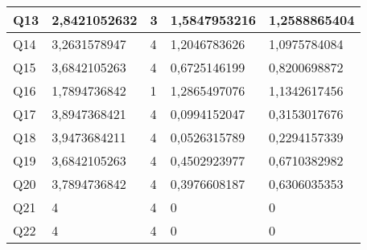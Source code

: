 \begin{appendices}
\begin{table}[!ht]
\begin{tabular}{|l|l|l|l|l|}
			Q13               & 2,8421052632  & 3               & 1,5847953216      & 1,2588865404    \\ \hline
			Q14               & 3,2631578947  & 4               & 1,2046783626      & 1,0975784084    \\ \hline
			Q15               & 3,6842105263  & 4               & 0,6725146199      & 0,8200698872    \\ \hline
			Q16               & 1,7894736842  & 1               & 1,2865497076      & 1,1342617456    \\ \hline
			Q17               & 3,8947368421  & 4               & 0,0994152047      & 0,3153017676    \\ \hline
			Q18               & 3,9473684211  & 4               & 0,0526315789      & 0,2294157339    \\ \hline
			Q19               & 3,6842105263  & 4               & 0,4502923977      & 0,6710382982    \\ \hline
			Q20               & 3,7894736842  & 4               & 0,3976608187      & 0,6306035353    \\ \hline
			Q21               & 4             & 4               & 0                 & 0               \\ \hline
			Q22               & 4             & 4               & 0                 & 0               \\ \hline
		\end{tabular}
	\end{table}
\end{appendices}